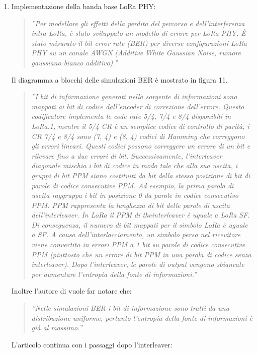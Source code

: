 \documentclass[a4paper]{report} %
\begin{document}
\begin{enumerate}
\item Implementazione della banda base LoRa PHY: 
\begin{quote}
	\textit{''Per modellare gli effetti della perdita del percorso e dell'interferenza intra-LoRa, è stato sviluppato un modello di errore per LoRa PHY. È stato misurato il bit error rate (BER) per diverse configurazioni LoRa PHY su un canale AWGN (Additive White Gaussian Noise, rumore gaussiano bianco additivo).''}
\end{quote}
Il diagramma a blocchi delle simulazioni BER è mostrato in figura 11. 
\begin{quote}
	\textit{''I bit di informazione generati nella sorgente di informazioni sono mappati ai bit di codice dall'encoder di correzione dell'errore. Questo codificatore implementa le code rate 5/4, 7/4 e 8/4 disponibili in LoRa.1, mentre il 5/4 CR è un semplice codice di controllo di parità, i CR 7/4 e 8/4 sono (7, 4) e (8, 4) codici di Hamming che correggono gli errori lineari. Questi codici possono correggere un errore di un bit e rilevare fino a due errori di bit. Successivamente, l'interleaver diagonale mischia i bit di codice in modo tale che alla sua uscita, i gruppi di bit PPM siano costituiti da bit della stessa posizione di bit di parole di codice consecutive PPM. Ad esempio, la prima parola di uscita raggruppa i bit in posizione 0 da parole in codice consecutivo PPM. PPM rappresenta la lunghezza di bit delle parole di uscita dell'interleaver. In LoRa il PPM di theinterleaver è uguale a LoRa SF. Di conseguenza, il numero di bit mappati per il simbolo LoRa è uguale a SF. A causa dell'interlacciamento, un simbolo perso nel ricevitore viene convertito in errori PPM a 1 bit su parole di codice consecutive PPM (piuttosto che un errore di bit PPM in una parola di codice senza interleaver). Dopo l'interleaver, le parole di output vengono sbiancate per aumentare l'entropia della fonte di informazioni.''}
\end{quote}
Inoltre l'autore di \cite{art:rif.49} vuole far notare che:
\begin{quote}
	\textit{''Nelle simulazioni BER i bit di informazione sono tratti da una distribuzione uniforme, pertanto l'entropia della fonte di informazioni è già al massimo.''}
\end{quote}
L'articolo continua con i passaggi dopo l'interleaver:

\end{enumerate}
\end{document}
